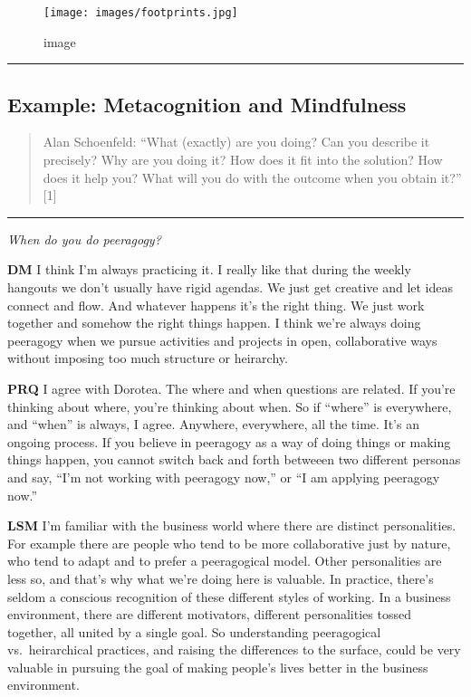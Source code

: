 \begin{figure}
\centering
\texttt{[image: images/footprints.jpg]}
\caption{image}
\end{figure}

\begin{center}\rule{0.5\linewidth}{0.5pt}\end{center}

\hypertarget{example-metacognition-and-mindfulness}{%
\subsection{Example: Metacognition and
Mindfulness}\label{example-metacognition-and-mindfulness}}

\begin{quote}
Alan Schoenfeld: ``What (exactly) are you doing? Can you describe it
precisely? Why are you doing it? How does it fit into the solution? How
does it help you? What will you do with the outcome when you obtain
it?'' {[}1{]}
\end{quote}

\begin{center}\rule{0.5\linewidth}{0.5pt}\end{center}

\emph{When do you do peeragogy?}

\textbf{DM} I think I'm always practicing it. I really like that during
the weekly hangouts we don't usually have rigid agendas. We just get
creative and let ideas connect and flow. And whatever happens it's the
right thing. We just work together and somehow the right things happen.
I think we're always doing peeragogy when we pursue activities and
projects in open, collaborative ways without imposing too much structure
or heirarchy.

\textbf{PRQ} I agree with Dorotea. The where and when questions are
related. If you're thinking about where, you're thinking about when. So
if ``where'' is everywhere, and ``when'' is always, I agree. Anywhere,
everywhere, all the time. It's an ongoing process. If you believe in
peeragogy as a way of doing things or making things happen, you cannot
switch back and forth betweeen two different personas and say, ``I'm not
working with peeragogy now,'' or ``I am applying peeragogy now.''

\textbf{LSM} I'm familiar with the business world where there are
distinct personalities. For example there are people who tend to be more
collaborative just by nature, who tend to adapt and to prefer a
peeragogical model. Other personalities are less so, and that's why what
we're doing here is valuable. In practice, there's seldom a conscious
recognition of these different styles of working. In a business
environment, there are different motivators, different personalities
tossed together, all united by a single goal. So understanding
peeragogical vs.~heirarchical practices, and raising the differences to
the surface, could be very valuable in pursuing the goal of making
people's lives better in the business environment.

